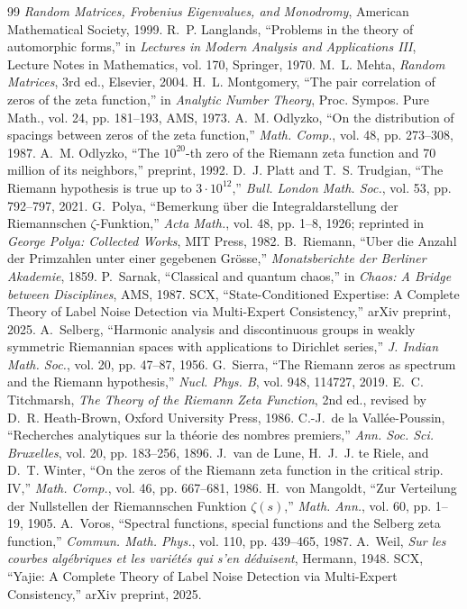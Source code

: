\documentclass[12pt,a4paper]{article}
\theoremstyle{remark}
\begin{document}
\begin{thebibliography}{99}
\emph{Random Matrices, Frobenius Eigenvalues, and Monodromy},
American Mathematical Society, 1999.
R.~P. Langlands,
``Problems in the theory of automorphic forms,''
in \emph{Lectures in Modern Analysis and Applications III},
Lecture Notes in Mathematics, vol. 170, Springer, 1970.
M.~L. Mehta,
\emph{Random Matrices}, 3rd ed.,
Elsevier, 2004.
H.~L. Montgomery,
``The pair correlation of zeros of the zeta function,''
in \emph{Analytic Number Theory},
Proc. Sympos. Pure Math., vol. 24, pp. 181--193, AMS, 1973.
A.~M. Odlyzko,
``On the distribution of spacings between zeros of the zeta function,''
\emph{Math. Comp.}, vol. 48, pp. 273--308, 1987.
A.~M. Odlyzko,
``The $10^{20}$-th zero of the Riemann zeta function and 70 million of its
neighbors,''
preprint, 1992.
D.~J. Platt and T.~S. Trudgian,
``The Riemann hypothesis is true up to $3 \cdot 10^{12}$,''
\emph{Bull. London Math. Soc.}, vol. 53, pp. 792--797, 2021.
G.~Polya,
``Bemerkung \"uber die Integraldarstellung der Riemannschen $\zeta$-Funktion,''
\emph{Acta Math.}, vol. 48, pp. 1--8, 1926; reprinted in
\emph{George Polya: Collected Works}, MIT Press, 1982.
B.~Riemann,
``Uber die Anzahl der Primzahlen unter einer gegebenen Gr\"osse,''
\emph{Monatsberichte der Berliner Akademie}, 1859.
P.~Sarnak,
``Classical and quantum chaos,''
in \emph{Chaos: A Bridge between Disciplines},
AMS, 1987.
SCX,
``State-Conditioned Expertise: A Complete Theory of Label Noise Detection
via Multi-Expert Consistency,''
arXiv preprint, 2025.
A.~Selberg,
``Harmonic analysis and discontinuous groups in weakly symmetric Riemannian
spaces with applications to Dirichlet series,''
\emph{J. Indian Math. Soc.}, vol. 20, pp. 47--87, 1956.
G.~Sierra,
``The Riemann zeros as spectrum and the Riemann hypothesis,''
\emph{Nucl. Phys. B}, vol. 948, 114727, 2019.
E.~C. Titchmarsh,
\emph{The Theory of the Riemann Zeta Function}, 2nd ed.,
revised by D.~R. Heath-Brown, Oxford University Press, 1986.
C.-J.~de la Vall\'ee-Poussin,
``Recherches analytiques sur la th\'eorie des nombres premiers,''
\emph{Ann. Soc. Sci. Bruxelles}, vol. 20, pp. 183--256, 1896.
J.~van de Lune, H.~J.~J. te Riele, and D.~T. Winter,
``On the zeros of the Riemann zeta function in the critical strip. IV,''
\emph{Math. Comp.}, vol. 46, pp. 667--681, 1986.
H.~von Mangoldt,
``Zur Verteilung der Nullstellen der Riemannschen Funktion $\zeta(s)$,''
\emph{Math. Ann.}, vol. 60, pp. 1--19, 1905.
A.~Voros,
``Spectral functions, special functions and the Selberg zeta function,''
\emph{Commun. Math. Phys.}, vol. 110, pp. 439--465, 1987.
A.~Weil,
\emph{Sur les courbes alg\'ebriques et les vari\'et\'es qui s'en d\'eduisent},
Hermann, 1948.
SCX,
``Yajie: A Complete Theory of Label Noise Detection via Multi-Expert
Consistency,''
arXiv preprint, 2025.
\end{thebibliography}
\end{document}
